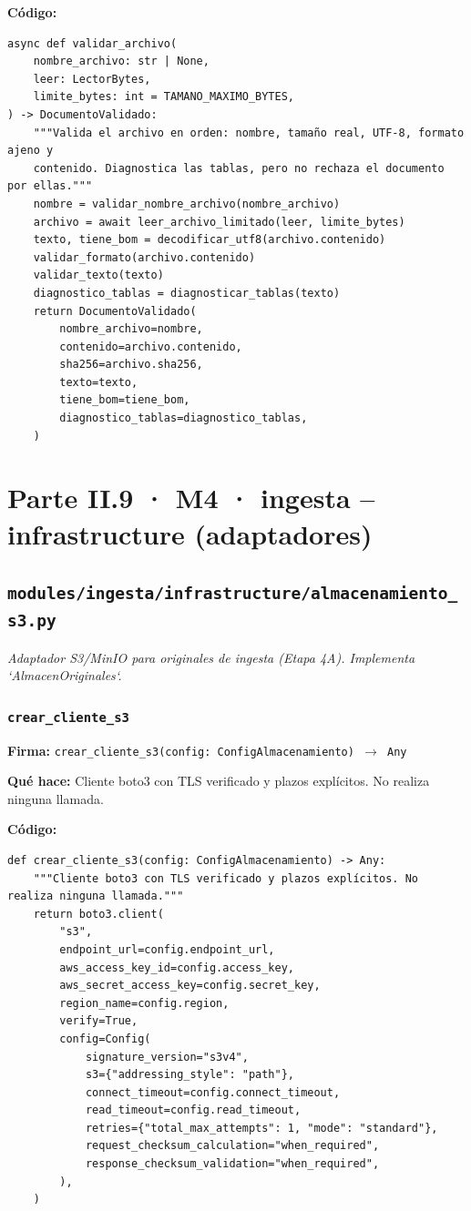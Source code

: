 \documentclass[11pt,a4paper]{article}
\begin{document}
\textbf{Código:}
\begin{lstlisting}
async def validar_archivo(
    nombre_archivo: str | None,
    leer: LectorBytes,
    limite_bytes: int = TAMANO_MAXIMO_BYTES,
) -> DocumentoValidado:
    """Valida el archivo en orden: nombre, tamaño real, UTF-8, formato ajeno y
    contenido. Diagnostica las tablas, pero no rechaza el documento por ellas."""
    nombre = validar_nombre_archivo(nombre_archivo)
    archivo = await leer_archivo_limitado(leer, limite_bytes)
    texto, tiene_bom = decodificar_utf8(archivo.contenido)
    validar_formato(archivo.contenido)
    validar_texto(texto)
    diagnostico_tablas = diagnosticar_tablas(texto)
    return DocumentoValidado(
        nombre_archivo=nombre,
        contenido=archivo.contenido,
        sha256=archivo.sha256,
        texto=texto,
        tiene_bom=tiene_bom,
        diagnostico_tablas=diagnostico_tablas,
    )
\end{lstlisting}

\section{Parte II.9 · M4 · ingesta -- infrastructure (adaptadores)}
\subsection{\texttt{modules/ingesta/infrastructure/almacenamiento\_s3.py}}
\textit{Adaptador S3/MinIO para originales de ingesta (Etapa 4A). Implementa `AlmacenOriginales`.}

\subsubsection*{\texttt{crear\_cliente\_s3}}
\textbf{Firma:} \texttt{crear\_cliente\_s3(config: ConfigAlmacenamiento) $\rightarrow$ Any}

\textbf{Qué hace:} Cliente boto3 con TLS verificado y plazos explícitos. No realiza ninguna llamada.

\textbf{Código:}
\begin{lstlisting}
def crear_cliente_s3(config: ConfigAlmacenamiento) -> Any:
    """Cliente boto3 con TLS verificado y plazos explícitos. No realiza ninguna llamada."""
    return boto3.client(
        "s3",
        endpoint_url=config.endpoint_url,
        aws_access_key_id=config.access_key,
        aws_secret_access_key=config.secret_key,
        region_name=config.region,
        verify=True,
        config=Config(
            signature_version="s3v4",
            s3={"addressing_style": "path"},
            connect_timeout=config.connect_timeout,
            read_timeout=config.read_timeout,
            retries={"total_max_attempts": 1, "mode": "standard"},
            request_checksum_calculation="when_required",
            response_checksum_validation="when_required",
        ),
    )
\end{lstlisting}
\end{document}

